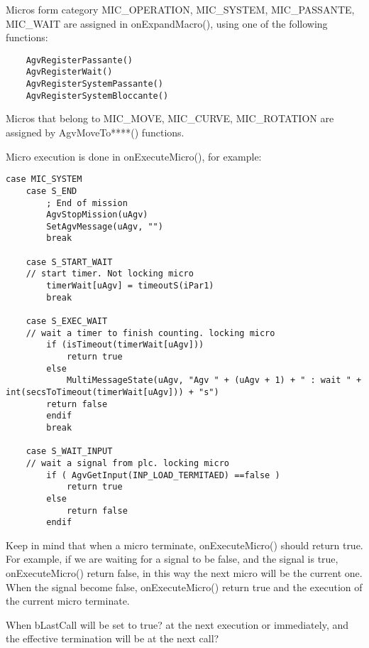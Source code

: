 Micros form category MIC\_OPERATION, MIC\_SYSTEM, MIC\_PASSANTE, MIC\_WAIT are assigned in onExpandMacro(), using one of the following functions:
\begin{lstlisting}
	AgvRegisterPassante()
	AgvRegisterWait()
	AgvRegisterSystemPassante()
	AgvRegisterSystemBloccante()
\end{lstlisting}

Micros that belong to MIC\_MOVE, MIC\_CURVE, MIC\_ROTATION are assigned by AgvMoveTo****() functions.

Micro execution is done in onExecuteMicro(), for example:

\begin{lstlisting}
case MIC_SYSTEM
	case S_END
		; End of mission
		AgvStopMission(uAgv)
		SetAgvMessage(uAgv, "")
		break
		
	case S_START_WAIT
	// start timer. Not locking micro
		timerWait[uAgv] = timeoutS(iPar1)
		break
	
	case S_EXEC_WAIT
	// wait a timer to finish counting. locking micro
		if (isTimeout(timerWait[uAgv]))
			return true
		else
			MultiMessageState(uAgv, "Agv " + (uAgv + 1) + " : wait " + int(secsToTimeout(timerWait[uAgv])) + "s")
		return false
		endif
		break
	
	case S_WAIT_INPUT
	// wait a signal from plc. locking micro
		if ( AgvGetInput(INP_LOAD_TERMITAED) ==false )
			return true
		else
			return false
		endif

\end{lstlisting}

Keep in mind that when a micro terminate, onExecuteMicro() should return true. For example, if we are waiting for a signal to be false, and the signal is true, onExecuteMicro() return false, in this way the next micro will be the current one.
When the signal become false, onExecuteMicro() return true and the execution of the current micro terminate.

When bLastCall will be set to true? at the next execution or immediately, and the effective termination will be at the next call?


